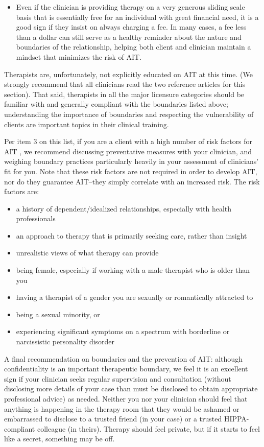 \documentclass[12pt,letterpaper]{book}
\begin{document}
\begin{itemize}
    \item Even if the clinician is providing therapy on a very generous sliding scale basis that is essentially free for an individual with great financial need, it is a good sign if they insist on always charging a fee. In many cases, a fee less than a dollar can still serve as a healthy reminder about the nature and boundaries of the relationship, helping both client and clinician maintain a mindset that minimizes the risk of AIT.
\end{itemize}
Therapists are, unfortunately, not explicitly educated on AIT at this time. (We strongly recommend that all clinicians read the two reference articles for this section). That said, therapists in all the major licensure categories should be familiar with and generally compliant with the boundaries listed above; understanding the importance of boundaries and respecting the vulnerability of clients are important topics in their clinical training.

Per item 3 on this list, if you are a client with a high number of risk factors for AIT \cite{transferranceLoveHarm,hook2018boundary}, we recommend discussing preventative measures with your clinician, and weighing boundary practices particularly heavily in your assessment of clinicians' fit for you. Note that these risk factors are not required in order to develop AIT, nor do they guarantee AIT–they simply correlate with an increased risk. The risk factors are:
\begin{itemize}
    \item a history of dependent/idealized relationships, especially with health professionals
    \item an approach to therapy that is primarily seeking care, rather than insight
    \item unrealistic views of what therapy can provide
    \item being female, especially if working with a male therapist who is older than you
    \item having a therapist of a gender you are sexually or romantically attracted to
    \item being a sexual minority, or
    \item experiencing significant symptoms on a spectrum with borderline or narcissistic personality disorder
\end{itemize}

A final recommendation on boundaries and the prevention of AIT: although confidentiality is an important therapeutic boundary, we feel it is an excellent sign if your clinician seeks regular supervision and consultation (without disclosing more details of your case than must be disclosed to obtain appropriate professional advice) as needed. Neither you nor your clinician should feel that anything is happening in the therapy room that they would be ashamed or embarrassed to disclose to a trusted friend (in your case) or a trusted HIPPA-compliant colleague (in theirs). Therapy should feel private, but if it starts to feel like a secret, something may be off.
\end{document}
